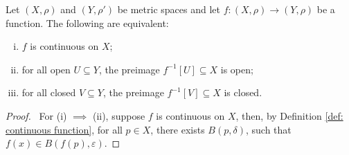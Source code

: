 \begin{lemma}
	Let $(X, \rho)$ and $(Y, \rho')$ be metric spaces and let $f: (X, \rho) \to (Y, \rho)$ be a function. The following are equivalent:
	\begin{enumerate}[(i)]
		\item $f$ is continuous on $X$;
		\item for all open $U \subseteq Y$, the preimage $f^{-1}[U] \subseteq X$ is open;
		\item for all closed $V \subseteq Y$, the preimage $f^{-1}[V] \subseteq X$ is closed.
	\end{enumerate}
\end{lemma}


\begin{proof} \ 
	For (i) $\implies$ (ii), suppose $f$ is continuous on $X$, then, by Definition \ref{def: continuous function}, for all $p \in X$, there exists $B(p, \delta)$, such that $f(x) \in B(f(p), \varepsilon)$.
	
\end{proof}





























%